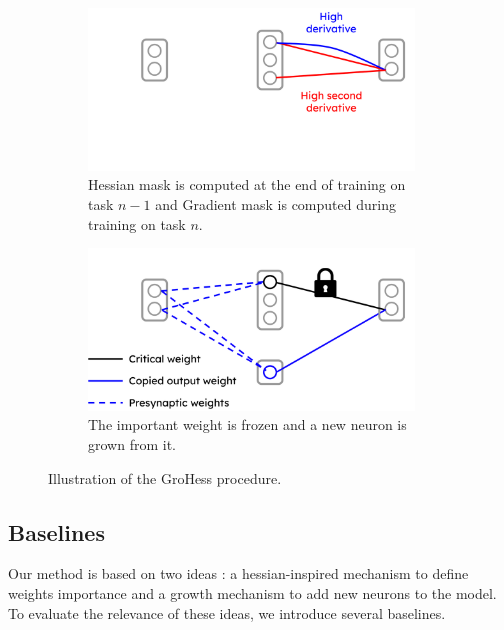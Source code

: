 \documentclass[11pt]{article}
\begin{document}
\begin{figure}
    \centering
    \begin{subfigure}[b]{0.4\textwidth}
        \centering
        \includegraphics[width=0.95\textwidth]{images/GroHess_explication_1.png}
        \caption{Hessian mask is computed at the end of training on task $n-1$ and Gradient mask is computed during training on task $n$.}
        \label{fig:GroHess_explication_1}
    \end{subfigure}
    \hspace{-0mm}
    \begin{subfigure}[b]{0.4\textwidth}
        \centering
        \includegraphics[width=0.95\textwidth]{images/GroHess_explication_2.png}
        \caption{The important weight is frozen and a new neuron is grown from it.}
        \label{fig:GroHess_explication_2}
    \end{subfigure}
    \caption{Illustration of the GroHess procedure.}
\end{figure}



\subsection{Baselines}


Our method is based on two ideas : a hessian-inspired mechanism to define weights importance and a growth mechanism to add new neurons to the model. To evaluate the relevance of these ideas, we introduce several baselines.
\end{document}

